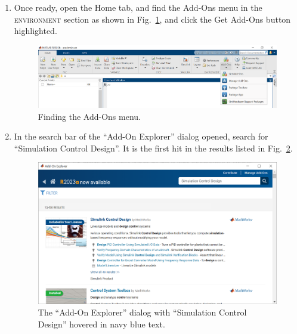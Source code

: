 \documentclass[12pt]{article}
\begin{document}
\begin{enumerate}
    \item
        Once ready,
        open the Home tab,
        and find the Add-Ons menu in the \textsc{environment} section
        as shown in Fig.~\ref{fig:finding addons},
        and click the Get Add-Ons button highlighted.

        \begin{figure}
            \centering
            \includegraphics[width=\linewidth]{img/intro_010_finding_addons.png}
            \caption{Finding the Add-Ons menu.}
            \label{fig:finding addons}
        \end{figure}

    \item
        In the search bar of the ``Add-On Explorer'' dialog opened,
        search for ``Simulation Control Design''.
        It is the first hit in the results listed in Fig.~\ref{fig:searching System Identification Toolbox}.

        \begin{figure}
            \centering
            \includegraphics[width=\linewidth]{img/intro_020_searching_simulink_control_design.png}
            \caption{The ``Add-On Explorer'' dialog with ``Simulation Control Design'' hovered in navy blue text.}
            \label{fig:searching System Identification Toolbox}
        \end{figure}


\end{enumerate}
\end{document}
